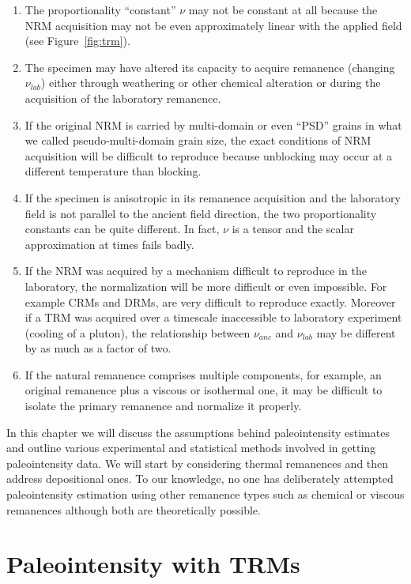 \begin{enumerate}
\item  The proportionality ``constant'' $\nu$ may not be constant at all because the NRM acquisition may not be even approximately linear with the applied field (see Figure~\ref{fig:trm}).   
\item  The specimen may have altered its capacity to acquire remanence (changing $\nu_{lab}$) either through weathering or other chemical alteration or during the acquisition of the laboratory remanence.
\item If the original NRM is carried by multi-domain or even ``PSD'' grains in what we called pseudo-multi-domain grain size,  the exact conditions of NRM acquisition will be difficult to reproduce because unblocking may occur at a different temperature than blocking. 
\item  If the specimen is anisotropic in its remanence acquisition and the laboratory field is not parallel to the ancient field direction, the two proportionality constants can be quite different.   In fact, $\nu$ is a tensor and the scalar approximation at times fails badly.
\item If the NRM  was acquired by a mechanism difficult to reproduce in the laboratory, the normalization will be more difficult or even impossible.   For example  CRMs and  DRMs,   are very difficult to reproduce exactly.  Moreover if a TRM was acquired over a  timescale inaccessible to laboratory experiment (cooling of a pluton), the relationship between $\nu_{anc}$ and $\nu_{lab}$ may be different by as much as a factor of two.  
\item  If the natural remanence comprises  multiple  components, for example, an original remanence plus a viscous or isothermal one, it may be difficult to isolate the primary remanence and normalize it properly.   
\end{enumerate}


    In this chapter we will discuss the assumptions behind paleointensity estimates and outline various experimental and statistical  methods involved in  getting paleointensity  data.    We will start by considering thermal remanences and  then address depositional ones.    To our knowledge, no one has deliberately attempted paleointensity estimation  using other remanence types such as chemical or viscous remanences although both are theoretically possible.

\section{Paleointensity with TRMs}


